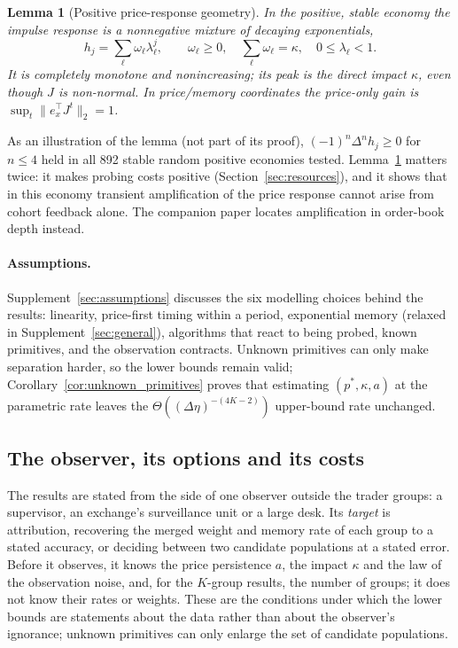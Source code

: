 \documentclass[12pt]{article}
\newtheorem{lemma}[theorem]{Lemma}
\theoremstyle{definition}
\theoremstyle{remark}
\begin{document}
\begin{lemma}[Positive price-response geometry]\label{lem:cm}
In the positive, stable economy the impulse response is a nonnegative mixture of decaying exponentials,
\[
h_j=\sum_\ell \omega_\ell\lambda_\ell^j,\qquad \omega_\ell\ge0,\quad \sum_\ell\omega_\ell=\kappa,\quad 0\le\lambda_\ell<1 .
\]
It is completely monotone and nonincreasing; its peak is the direct impact $\kappa$, even though $J$ is non-normal. In price/memory coordinates the price-only gain is $\sup_t\|e_x^\top J^t\|_2=1$.
\end{lemma}

As an illustration of the lemma (not part of its proof), $(-1)^n\Delta^nh_j\ge0$ for $n\le4$ held in all 892 stable random positive economies tested. Lemma~\ref{lem:cm} matters twice: it makes probing costs positive (Section~\ref{sec:resources}), and it shows that in this economy transient amplification of the price response cannot arise from cohort feedback alone. The companion paper locates amplification in order-book depth instead.

\paragraph{Assumptions.} Supplement~\ref{sec:assumptions} discusses the six modelling choices behind the results: linearity, price-first timing within a period, exponential memory (relaxed in Supplement~\ref{sec:general}), algorithms that react to being probed, known primitives, and the observation contracts. Unknown primitives can only make separation harder, so the lower bounds remain valid; Corollary~\ref{cor:unknown_primitives} proves that estimating $(p^*,\kappa,a)$ at the parametric rate leaves the $\Theta((\Delta\eta)^{-(4K-2)})$ upper-bound rate unchanged.

\subsection{The observer, its options and its costs}\label{sec:observer}
The results are stated from the side of one observer outside the trader groups: a supervisor, an exchange's surveillance unit or a large desk. Its \emph{target} is attribution, recovering the merged weight and memory rate of each group to a stated accuracy, or deciding between two candidate populations at a stated error. Before it observes, it knows the price persistence $a$, the impact $\kappa$ and the law of the observation noise, and, for the $K$-group results, the number of groups; it does not know their rates or weights. These are the conditions under which the lower bounds are statements about the data rather than about the observer's ignorance; unknown primitives can only enlarge the set of candidate populations.
\end{document}
